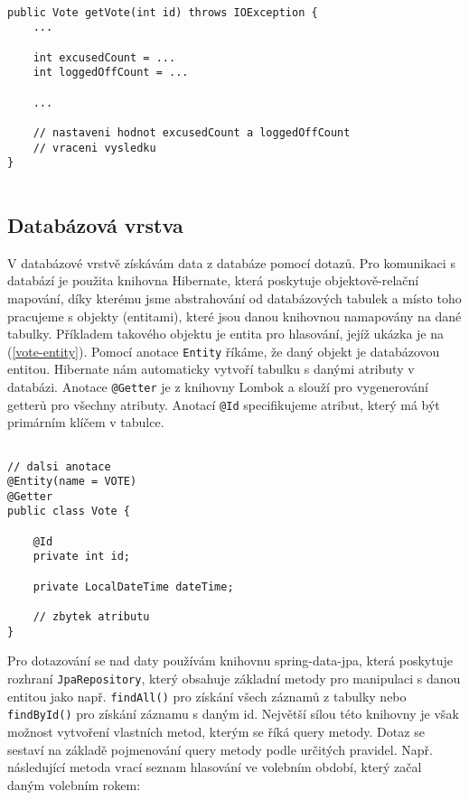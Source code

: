 \begin{lstlisting}[caption={Ukázka dopočtu statistik pro detail hlasování za běhu v doménové vrstvě}, label={lst:excused-count}, tabsize=2]
	
public Vote getVote(int id) throws IOException {
	...
	
	int excusedCount = ... 	
	int loggedOffCount = ...
	
	...
	
	// nastaveni hodnot excusedCount a loggedOffCount
	// vraceni vysledku
}
	
\end{lstlisting}

\subsection {Databázová vrstva}
V databázové vrstvě získávám data z databáze pomocí dotazů. Pro komunikaci s databází je použita knihovna Hibernate, která poskytuje objektově-relační mapování, díky kterému jsme abstrahování od databázových tabulek a místo toho pracujeme s objekty (entitami), které jsou danou knihovnou namapovány na dané tabulky. Příkladem takového objektu je entita pro hlasování, jejíž ukázka je na (\ref{vote-entity}). Pomocí anotace \lstinline|Entity| říkáme, že daný objekt je databázovou entitou. Hibernate nám automaticky vytvoří tabulku s danými atributy v databázi. Anotace \lstinline|@Getter| je z knihovny Lombok a slouží pro vygenerování getterů pro všechny atributy. Anotací \lstinline|@Id| specifikujeme atribut, který má být primárním klíčem v tabulce.

\begin{lstlisting}[caption={Entita Vote reprezentující hlasování}, label={lst:vote-entity}, tabsize=2]

// dalsi anotace
@Entity(name = VOTE)
@Getter
public class Vote {
	
	@Id
	private int id;

 	private LocalDateTime dateTime;

	// zbytek atributu
}

\end{lstlisting}

\noindent Pro dotazování se nad daty používám knihovnu spring-data-jpa, která poskytuje rozhraní \lstinline|JpaRepository|, který obsahuje základní metody pro manipulaci s danou entitou jako např. \lstinline|findAll()| pro získání všech záznamů z tabulky nebo \lstinline|findById()| pro získání záznamu s daným id. Největší sílou této knihovny je však možnost vytvoření vlastních metod, kterým se říká query metody. Dotaz se sestaví na základě pojmenování query metody podle určitých pravidel. Např. následující metoda vrací seznam hlasování ve volebním období, který začal daným volebním rokem:

